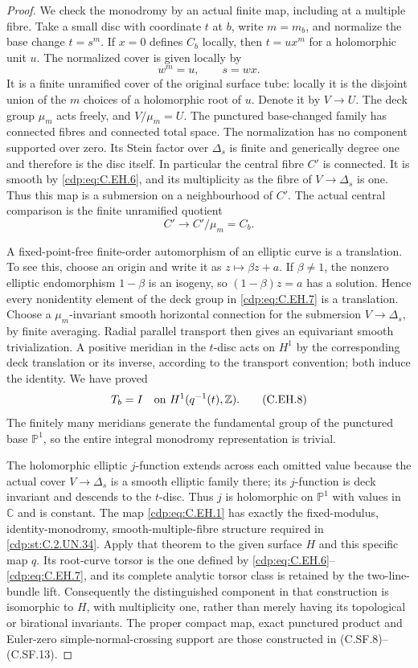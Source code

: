 \begin{proof}
We check the monodromy by an actual finite map, including
at a multiple fibre. Take a small disc with coordinate $t$
at $b$, write $m=m_b$, and normalize the base change
$t=s^m$. If $x=0$ defines $C_b$ locally, then
$t=u x^m$ for a holomorphic unit $u$. The normalized
cover is given locally by
\[
                     w^m=u,\qquad s=wx.
\tag{C.EH.6}\label{cdp:eq:C.EH.6}
\]
It is a finite unramified cover of the original surface
tube: locally it is the disjoint union of the $m$ choices
of a holomorphic root of $u$. Denote it by $V\to U$.
The deck group $\mu_m$ acts freely, and $V/\mu_m=U$.
The punctured base-changed family has connected fibres
and connected total space. The normalization has no
component supported over zero. Its Stein factor over
$\Delta_s$ is finite and generically degree one and
therefore is the disc itself. In particular the central
fibre $C'$ is connected. It is smooth by \eqref{cdp:eq:C.EH.6}, and
its multiplicity as the fibre of $V\to\Delta_s$ is one.
Thus this map is a submersion on a neighbourhood of $C'$.
The actual central comparison is the finite unramified
quotient
\[
                         C'\longrightarrow C'/\mu_m=C_b.
\tag{C.EH.7}\label{cdp:eq:C.EH.7}
\]

A fixed-point-free finite-order automorphism of an elliptic
curve is a translation. To see this, choose an origin and
write it as $z\mapsto\beta z+a$. If $\beta\ne1$, the
nonzero elliptic endomorphism $1-\beta$ is an isogeny,
so $(1-\beta)z=a$ has a solution. Hence every nonidentity
element of the deck group in \eqref{cdp:eq:C.EH.7} is a translation.
Choose a $\mu_m$-invariant smooth horizontal connection
for the submersion $V\to\Delta_s$, by finite averaging.
Radial parallel transport then gives an equivariant
smooth trivialization. A positive meridian in the
$t$-disc acts on $H^1$ by the corresponding deck
translation or its inverse, according to the transport
convention; both induce the identity. We have proved
\[
                  T_b=I\quad\hbox{on }H^1(q^{-1}(t),\mathbb Z).
\tag{C.EH.8}\label{cdp:eq:C.EH.8}
\]
The finitely many meridians generate the fundamental
group of the punctured base $\mathbb P^1$, so the entire
integral monodromy representation is trivial.

The holomorphic elliptic $j$-function extends across
each omitted value because the actual cover
$V\to\Delta_s$ is a smooth elliptic family there;
its $j$-function is deck invariant and descends to
the $t$-disc. Thus $j$ is holomorphic on $\mathbb P^1$
with values in $\mathbb C$ and is constant. The map
\eqref{cdp:eq:C.EH.1} has exactly the fixed-modulus, identity-monodromy,
smooth-multiple-fibre structure required in \ref{cdp:st:C.2.UN.34}.
Apply that theorem to the given surface $H$ and this
specific map $q$. Its root-curve torsor is the one
defined by \eqref{cdp:eq:C.EH.6}--\eqref{cdp:eq:C.EH.7}, and its complete analytic
torsor class is retained by the two-line-bundle lift.
Consequently the distinguished component in that
construction is isomorphic to $H$, with multiplicity
one, rather than merely having its topological or
birational invariants. The proper compact map, exact
punctured product and Euler-zero simple-normal-crossing
support are those constructed in (C.SF.8)--(C.SF.13).
\end{proof}


